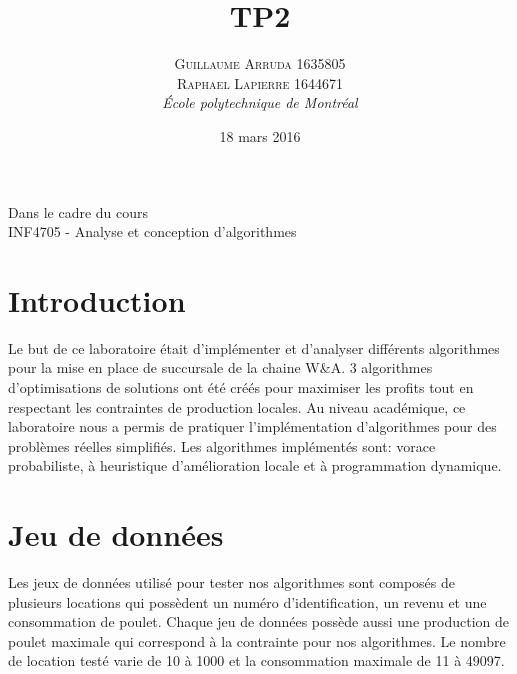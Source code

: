 \documentclass[a4paper, 12pt]{article} %
\title{TP2}
\author{\textsc{Guillaume Arruda 1635805\\Raphael Lapierre 1644671} %
\vspace{10pt}
\\{\textit{École polytechnique de Montréal}}} %
\date{18 mars 2016} %
\makeatletter
\renewcommand{\maketitle}{ %
\begin{center} %

\vspace*{25pt} %
{\LARGE\@title} %

\vspace{125pt} %

{\large\@author} %

\vspace{125pt} %
Dans le cadre du cours
\\INF4705 - Analyse et conception d'algorithmes
\vspace{125pt} %
\\\@date %
\vspace{125pt} %

\end{center}
}
\makeatother
\begin{document}
\thispagestyle{empty}
\clearpage\maketitle %
\pagebreak[4]

\setlength{\headheight}{15.0pt}
\pagestyle{fancy}
\fancyhead[C]{}

\section*{Introduction}
Le but de ce laboratoire était d'implémenter et d'analyser différents algorithmes pour la mise en place de succursale de la chaine
W\&A. 3 algorithmes d'optimisations de solutions ont été créés pour maximiser les profits tout en respectant les contraintes de production
locales. Au niveau académique, ce laboratoire nous a permis de pratiquer l'implémentation d'algorithmes pour des problèmes réelles simplifiés. Les algorithmes implémentés sont: vorace probabiliste, à heuristique d'amélioration locale et à programmation dynamique.
\section*{Jeu de données}
Les jeux de données utilisé pour tester nos algorithmes sont composés de plusieurs locations qui possèdent un numéro d'identification, un revenu et une consommation de poulet. Chaque jeu de données possède aussi une production de poulet maximale qui correspond à la contrainte pour nos algorithmes. Le nombre de location testé varie de 10 à 1000 et la consommation maximale de 11 à 49097.
\end{document}
